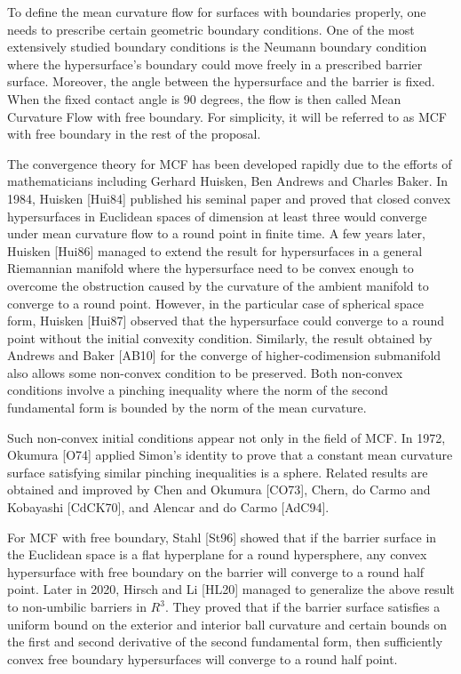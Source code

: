 To define the mean curvature flow for surfaces with boundaries properly, one needs to prescribe certain geometric boundary conditions. One of the most extensively studied boundary conditions is the Neumann boundary condition where the hypersurface's boundary could move freely in a prescribed barrier surface. Moreover, the angle between the hypersurface and the barrier is fixed. When the fixed contact angle is 90 degrees, the flow is then called Mean Curvature Flow with free boundary. For simplicity, it will be referred to as MCF with free boundary in the rest of the proposal.
 
The convergence theory for MCF has been developed rapidly due to the efforts of mathematicians including Gerhard Huisken, Ben Andrews and Charles Baker. In 1984, Huisken [Hui84] published his seminal paper and proved that closed convex hypersurfaces in Euclidean spaces of dimension at least three would converge under mean curvature flow to a round point in finite time. A few years later, Huisken [Hui86] managed to extend the result for hypersurfaces in a general Riemannian manifold where the hypersurface need to be convex enough to overcome the obstruction caused by the curvature of the ambient manifold to converge to a round point. However, in the particular case of spherical space form, Huisken [Hui87] observed that the hypersurface could converge to a round point without the initial convexity condition. Similarly, the result obtained by Andrews and Baker [AB10] for the converge of higher-codimension submanifold also allows some non-convex condition to be preserved. Both non-convex conditions involve a pinching inequality where the norm of the second fundamental form is bounded by the norm of the mean curvature.

Such non-convex initial conditions appear not only in the field of MCF. In 1972, Okumura [O74] applied Simon's identity to prove that a constant mean curvature surface satisfying similar pinching inequalities is a sphere. Related results are obtained and improved by Chen and Okumura [CO73], Chern, do Carmo and Kobayashi [CdCK70], and Alencar and do Carmo [AdC94].

For MCF with free boundary, Stahl [St96] showed that if the barrier surface in the Euclidean space is a flat hyperplane for a round hypersphere, any convex hypersurface with free boundary on the barrier will converge to a round half point. Later in 2020, Hirsch and Li [HL20] managed to generalize the above result to non-umbilic barriers in $R^3$. They proved that if the barrier surface satisfies a uniform bound on the exterior and interior ball curvature and certain bounds on the first and second derivative of the second fundamental form, then sufficiently convex free boundary hypersurfaces will converge to a round half point.

